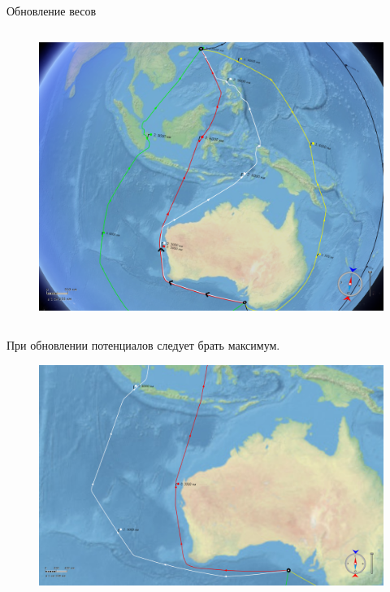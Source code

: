 \documentclass[russian, hyperref={unicode}]{beamer}
\begin{document}
\begin{frame}[noframenumbering]{Обновление весов}
{\begin{columns}
            \begin{figure}
                \includegraphics[clip=true, trim = 280pt 0 20pt 0, width=\textwidth]{Solution/potentials-update/max_result}
            \end{figure}
        \end{columns}
        
        \begin{center}
            При обновлении потенциалов следует брать максимум.
        \end{center}
    }
   
     {
        \begin{figure}
          \begin{columns}
            \includegraphics[clip=true, trim = 300pt 20pt 330pt 350pt, width=\textwidth]{Solution/weights-on-path-bad}


\end{columns}
\end{figure}}
\end{frame}
\end{document}
